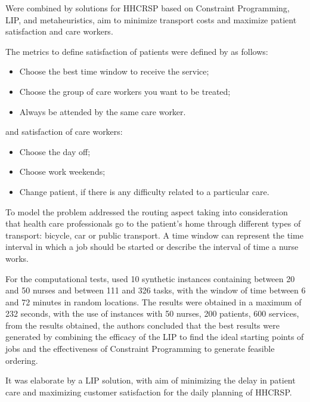 Were combined by  solutions for \ac{HHCRSP} based on Constraint Programming, \ac{LIP}, and metaheuristics, aim to minimize transport costs and maximize patient satisfaction and care workers.

The metrics to define satisfaction of patients were defined by  as follows:

\begin{itemize}
\item Choose the best time window to receive the service;
\item Choose the group of care workers you want to be treated;
\item Always be attended by the same care worker.
\end{itemize}

and satisfaction of care workers: 

\begin{itemize}
\item Choose the day off;
\item Choose work weekends;
\item Change patient, if there is any difficulty related to a particular care.
\end{itemize}

To model the problem  addressed the routing aspect taking into consideration that health care professionals go to the patient's home through different types of transport: bicycle, car or public transport. A time window can represent the time interval in which a job should be started or describe the interval of time a nurse works.

For the computational tests,  used 10 synthetic instances containing between 20 and 50 nurses and between 111 and 326 tasks, with the window of time between 6 and 72 minutes in random locations. The results were obtained in a maximum of 232 seconds, with the use of instances with 50 nurses, 200 patients, 600 services, from the results obtained, the authors concluded that the best results were generated by combining the efficacy of the \ac{LIP} to find the ideal starting points of jobs and the effectiveness of Constraint Programming to generate feasible ordering.

It was elaborate by  a \ac{LIP} solution, with aim of minimizing the delay in patient care and maximizing customer satisfaction for the daily planning of \ac{HHCRSP}. 

